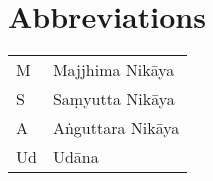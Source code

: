 \chapter{Abbreviations}

\begin{tabular}{l l}
M & Majjhima Nikāya\\
S & Saṃyutta Nikāya\\
A & Aṅguttara Nikāya\\
Ud & Udāna\\
\end{tabular}
